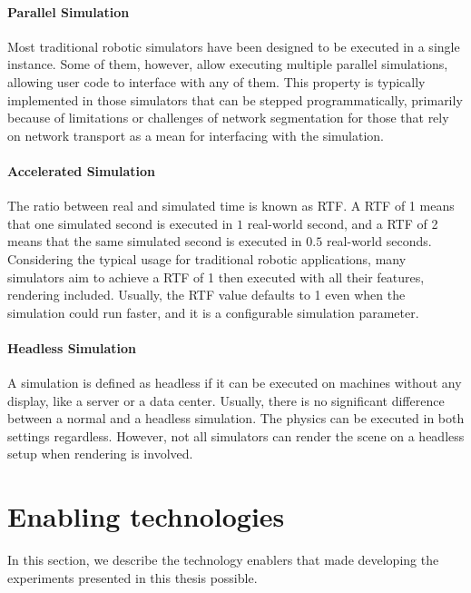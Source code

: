 \paragraph{Parallel Simulation}

Most traditional robotic simulators have been designed to be executed in a single instance.
Some of them, however, allow executing multiple parallel simulations, allowing user code to interface with any of them.
This property is typically implemented in those simulators that can be stepped programmatically, primarily because of limitations or challenges of network segmentation for those that rely on network transport as a mean for interfacing with the simulation.

\paragraph{Accelerated Simulation}

The ratio between real and simulated time is known as \ac{RTF}.
A \ac{RTF} of 1 means that one simulated second is executed in $1$ real-world second, and a \ac{RTF} of 2 means that the same simulated second is executed in $0.5$ real-world seconds.
Considering the typical usage for traditional robotic applications, many simulators aim to achieve a \ac{RTF} of 1 then executed with all their features, rendering included.
Usually, the \ac{RTF} value defaults to 1 even when the simulation could run faster, and it is a configurable simulation parameter.

\paragraph{Headless Simulation}

A simulation is defined as headless if it can be executed on machines without any display, like a server or a data center.
Usually, there is no significant difference between a normal and a headless simulation.
The physics can be executed in both settings regardless.
However, not all simulators can render the scene on a headless setup when rendering is involved.

\section{Enabling technologies}

In this section, we describe the technology enablers that made developing the experiments presented in this thesis possible.

